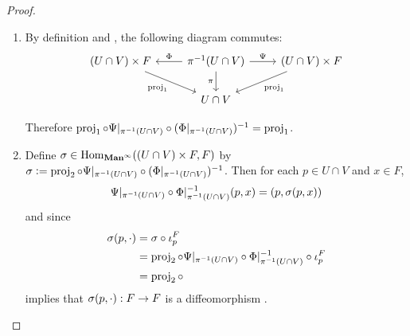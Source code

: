 \documentclass{book}
\begin{document}
	\begin{proof}\
		\begin{enumerate}
			\item By definition and , the following diagram commutes:
			\[ 
			\begin{tikzcd}
				(U \cap V) \times F  \arrow[dr, "\prj_{1}"'] & \pi^{-1}(U \cap V) \arrow[d, "{\pi}"'] \arrow[l, "{\Phi}"'] \arrow[r, "\Psi"] & (U \cap V) \times F \arrow[dl, "{\prj_1}"]  \\
													                & U \cap V
			\end{tikzcd}
			\] 
			
			Therefore $\operatorname{\text{proj}}_1 \circ \Psi|_{\pi^{-1}(U \cap V)} \circ (\Phi|_{\pi^{-1}(U \cap V)})^{-1} = \operatorname{\text{proj}}_1$.
			\item Define $\sigma \in \operatorname{Hom}_{\operatorname*{\text{\textbf{Man}}^{\infty}}}(( U \cap V) \times F,  F)$ by $\sigma \vcentcolon= \operatorname{\text{proj}}_2 \circ \Psi|_{\pi^{-1}(U \cap V)} \circ (\Phi|_{\pi^{-1}(U \cap V)})^{-1}$. Then for each $p \in U \cap V$ and $x \in F$, 
			$$\Psi|_{\pi^{-1}(U \cap V)} \circ \Phi|^{-1}_{\pi^{-1}(U \cap V)}(p, x) = (p, \sigma(p, x))$$ 
			and since  
			\begin{align*}
				\sigma(p, \cdot) 
				& = \sigma \circ \iota_p^F \\
				& = \operatorname{\text{proj}}_2 \circ \Psi|_{\pi^{-1}(U \cap V)} \circ \Phi|^{-1}_{\pi^{-1}(U \cap V)} \circ \iota_p^F \\
				& = \operatorname{\text{proj}}_2 \circ
			\end{align*}
			 implies that $\sigma(p, \cdot): F \rightarrow F$ is a diffeomorphism .   
		\end{enumerate}
	\end{proof}


	
	
	
	
	
	
	
	
	
	
	
	
\end{document}
